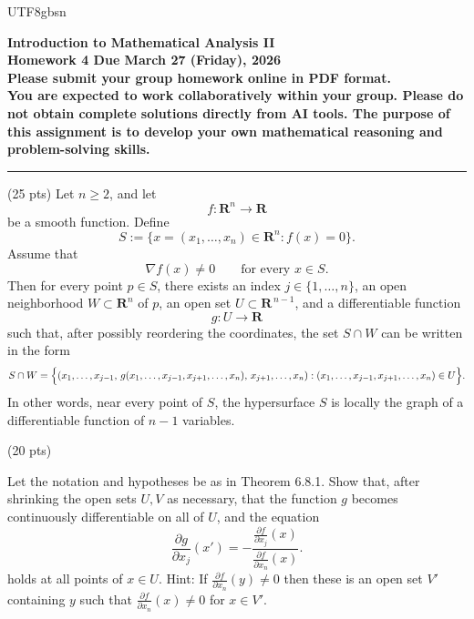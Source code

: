 \documentclass[addpoints]{exam}
\theoremstyle{definition}
\begin{document}
\begin{CJK*}{UTF8}{gbsn}
\begin{center}
    {\Large{\bf Introduction to Mathematical Analysis II\\
    Homework 4  Due  March 27 (Friday), 2026\\
    Please submit your group homework online in PDF format.\\
You are expected to work collaboratively within your group. 
Please do not obtain complete solutions directly from AI tools. 
The purpose of this assignment is to develop your own mathematical reasoning and problem-solving skills. %
  }} \\ 
    \large
\end{center}

\noindent\rule{16.2cm}{0.4pt}


\begin{questions}


\question  (25 pts)  
Let \(n\ge 2\), and let
\[
f:\mathbf{R}^n\to \mathbf{R}
\]
be a smooth function. Define
\[
S:=\{x=(x_1,\dots,x_n)\in \mathbf{R}^n : f(x)=0\}.
\]
Assume that
\[
\nabla f(x)\neq 0
\qquad\text{for every }x\in S.
\]
Then for every point \(p\in S\), there exists an index \(j\in\{1,\dots,n\}\), an open neighborhood
\(W\subset \mathbf{R}^n\) of \(p\), an open set \(U\subset \mathbf{R}^{\,n-1}\), and a differentiable
function
\[
g:U\to \mathbf{R}
\]
such that, after possibly reordering the coordinates, the set \(S\cap W\) can be written in the form
\[
S\cap W
=
\Bigl\{
(x_1,\dots,x_{j-1},\, g(x_1,\dots,x_{j-1},x_{j+1},\dots,x_n),\, x_{j+1},\dots,x_n)
:
(x_1,\dots,x_{j-1},x_{j+1},\dots,x_n)\in U
\Bigr\}.
\]
In other words, near every point of \(S\), the hypersurface \(S\) is locally the graph of a differentiable
function of \(n-1\) variables.

\begin{solution}
\end{solution}

\question (20 pts) 

Let the notation and hypotheses be as in Theorem \textup{6.8.1}. Show that, after shrinking
the open sets $U,V$ as necessary, that the function $g$ becomes continuously differentiable
on all of $U$, and the equation
\begin{equation*}%
\frac{\partial g}{\partial x_j}(x')
=
-\frac{\frac{\partial f}{\partial x_j}(x)}{\frac{\partial f}{\partial x_n}(x)}.
\end{equation*}
 holds at all points of $x\in U$.
 Hint: If $\frac{\partial f}{\partial x_n}(y) \neq 0$ then these is an open set $V'$ containing $y$
 such that $\frac{\partial f}{\partial x_n}(x) \neq 0$ for $x\in V'$.


\end{questions}
\end{CJK*}
\end{document}
